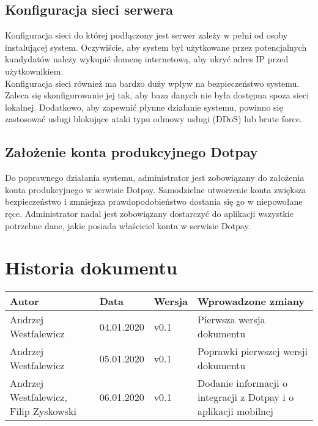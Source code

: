 \documentclass{article}
\begin{document}
\subsection{Konfiguracja sieci serwera}
Konfiguracja sieci do której podłączony jest serwer zależy w pełni od osoby instalującej system. Oczywiście, aby system był użytkowane przez potencjalnych kandydatów należy wykupić domenę internetową, aby ukryć adres IP przed użytkownikiem.\\
Konfiguracja sieci również ma bardzo duży wpływ na bezpieczeństwo systemu. Zaleca się skonfigurowanie jej tak, aby baza danych nie była dostępna spoza sieci lokalnej. Dodatkowo, aby zapewnić płynne działanie systemu, powinno się zastosować usługi blokujące ataki typu odmowy usługi (DDoS) lub brute force. 
\subsection{Założenie konta produkcyjnego Dotpay}
Do poprawnego działania systemu, administrator jest zobowiązany do założenia konta produkcyjnego w serwisie Dotpay. Samodzielne utworzenie konta zwiększa bezpieczeństwo i zmniejsza prawdopodobieństwo dostania się go w niepowołane ręce. Administrator nadal jest zobowiązany dostarczyć do aplikacji wszystkie potrzebne dane, jakie posiada właściciel konta w serwisie Dotpay.

\section{Historia dokumentu}

\begin{tabularx}{\linewidth}{|X|l|l|X|}
    \hline
    Autor & Data & Wersja & Wprowadzone zmiany \\
    \hline
    Andrzej Westfalewicz & 04.01.2020 & v0.1 & Pierwsza wersja dokumentu \\
    \hline
    Andrzej Westfalewicz & 05.01.2020 & v0.1 & Poprawki pierwszej wersji dokumentu \\
    \hline
    Andrzej Westfalewicz, Filip Zyskowski & 06.01.2020 & v0.1 & Dodanie informacji o integracji z Dotpay i o aplikacji mobilnej  \\
    \hline
\end{tabularx}
\end{document}
